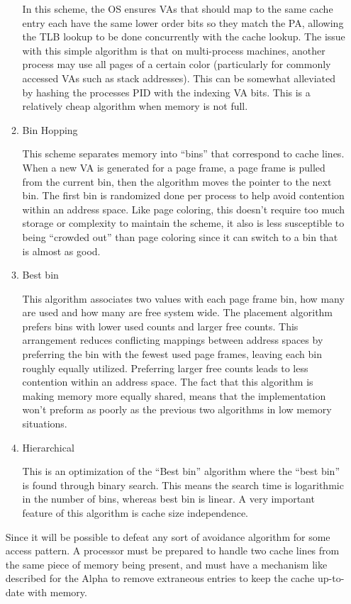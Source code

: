 \documentclass[a4paper, 11pt]{exam}
\begin{document}
\begin{enumerate}
\begin{enumerate}
In this scheme, the OS ensures VAs that should map to the same 
cache entry each have the same lower order bits so they match the PA, allowing 
the TLB lookup to be done concurrently with the cache lookup. The issue with this simple
algorithm is that on multi-process machines, another process may use all pages of a certain
color (particularly for commonly accessed VAs such as stack addresses). This can be somewhat alleviated
by hashing the processes PID with the indexing VA bits. This is a relatively
cheap algorithm when memory is not full.

\item Bin Hopping

This scheme separates memory into ``bins'' that correspond to cache lines. When a new VA is generated for
a page frame, a page frame is pulled from the current bin, then the algorithm moves the pointer to the 
next bin. The first bin is randomized done per process to help avoid contention within an address space.
Like page coloring, this doesn't require too much storage or complexity to maintain the scheme, it also
is less susceptible to being ``crowded out'' than page coloring since it can switch to a bin that is almost
as good.

\item Best bin

This algorithm associates two values with each page frame bin, how many are used and how many are free system wide.
The placement algorithm prefers bins with lower used counts and larger free counts. This arrangement reduces 
conflicting mappings between address spaces by preferring the bin with the fewest used page frames, leaving
each bin roughly equally utilized. Preferring larger free counts leads to less contention within an address space.
The fact that this algorithm is making memory more equally shared, means that the implementation won't preform as
poorly as the previous two algorithms in low memory situations.

\item Hierarchical

This is an optimization of the ``Best bin'' algorithm where the ``best bin'' is found through binary search.
This means the search time is logarithmic in the number of bins, whereas best bin is linear. A very important
feature of this algorithm is cache size independence.

\end{enumerate}

Since it will be possible to defeat any sort of avoidance algorithm for some access pattern. A processor must
be prepared to handle two cache lines from the same piece of memory being present, and must have a mechanism
like described for the Alpha to remove extraneous entries to keep the cache up-to-date with memory.


\end{enumerate}
\end{document}
